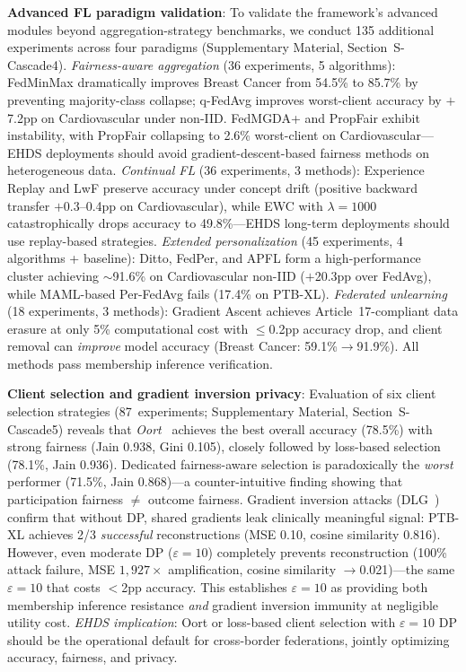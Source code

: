\documentclass[conference,a4paper]{IEEEtran}
\begin{document}
\textbf{Advanced FL paradigm validation}: To validate the framework's advanced modules beyond aggregation-strategy benchmarks, we conduct 135 additional experiments across four paradigms (Supplementary Material, Section~S-Cascade4). \textit{Fairness-aware aggregation} (36 experiments, 5 algorithms): FedMinMax dramatically improves Breast Cancer from 54.5\% to 85.7\% by preventing majority-class collapse; q-FedAvg improves worst-client accuracy by $+$7.2pp on Cardiovascular under non-IID. FedMGDA+ and PropFair exhibit instability, with PropFair collapsing to 2.6\% worst-client on Cardiovascular---EHDS deployments should avoid gradient-descent-based fairness methods on heterogeneous data. \textit{Continual FL} (36 experiments, 3 methods): Experience Replay and LwF preserve accuracy under concept drift (positive backward transfer $+$0.3--0.4pp on Cardiovascular), while EWC with $\lambda{=}1000$ catastrophically drops accuracy to 49.8\%---EHDS long-term deployments should use replay-based strategies. \textit{Extended personalization} (45 experiments, 4 algorithms + baseline): Ditto, FedPer, and APFL form a high-performance cluster achieving $\sim$91.6\% on Cardiovascular non-IID ($+$20.3pp over FedAvg), while MAML-based Per-FedAvg fails (17.4\% on PTB-XL). \textit{Federated unlearning} (18 experiments, 3 methods): Gradient Ascent achieves Article~17-compliant data erasure at only 5\% computational cost with $\leq$0.2pp accuracy drop, and client removal can \textit{improve} model accuracy (Breast Cancer: 59.1\%$\to$91.9\%). All methods pass membership inference verification.

\textbf{Client selection and gradient inversion privacy}: Evaluation of six client selection strategies (87~experiments; Supplementary Material, Section~S-Cascade5) reveals that \textit{Oort}~\cite{lai2021oort} achieves the best overall accuracy (78.5\%) with strong fairness (Jain 0.938, Gini 0.105), closely followed by loss-based selection (78.1\%, Jain 0.936). Dedicated fairness-aware selection is paradoxically the \textit{worst} performer (71.5\%, Jain 0.868)---a counter-intuitive finding showing that participation fairness $\neq$ outcome fairness. Gradient inversion attacks (DLG~\cite{zhu2019deep}) confirm that without DP, shared gradients leak clinically meaningful signal: PTB-XL achieves 2/3 \textit{successful} reconstructions (MSE 0.10, cosine similarity 0.816). However, even moderate DP ($\varepsilon{=}10$) completely prevents reconstruction (100\% attack failure, MSE $1{,}927\times$ amplification, cosine similarity $\to$0.021)---the same $\varepsilon{=}10$ that costs $<$2pp accuracy. This establishes $\varepsilon{=}10$ as providing both membership inference resistance \textit{and} gradient inversion immunity at negligible utility cost. \textit{EHDS implication}: Oort or loss-based client selection with $\varepsilon{=}10$ DP should be the operational default for cross-border federations, jointly optimizing accuracy, fairness, and privacy.
\end{document}
